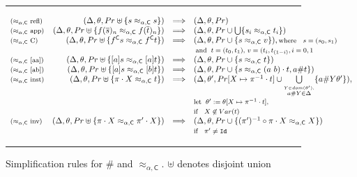 \documentclass[submission,copyright,creativecommons]{eptcs}
\newcommand{\caleq}{\approx_{\alpha,\theory{C}}}
\newcommand{\theory}[1]{\ensuremath{\mathsf{#1}}}
\theoremstyle{plain}
\theoremstyle{definition}
\theoremstyle{remark}
\begin{document}
\begin{figure}[!t]
\rule{15.3cm}{0.01cm}
{\small
    $$    
    \begin{array}{lrll}
        {\text{\footnotesize ($\caleq$ refl)}} & (\Delta, \theta, Pr \uplus \{s \caleq s \}) & \Longrightarrow & (\Delta, \theta, Pr)\\
        {\text{\footnotesize ($\caleq$ app)}} & (\Delta, \theta, Pr \uplus \{f(\overline{s})_n \caleq f(\overline{t})_n \}) & \Longrightarrow & (\Delta, \theta, Pr \cup \bigcup\{ s_i \caleq t_i \} )\\
        {\text{\footnotesize ($\caleq$ C)}} & (\Delta, \theta, Pr \uplus \{f^\theory{C} s \caleq f^\theory{C} t \}) & \Longrightarrow & (\Delta, \theta, Pr \cup \{ s \caleq v \}), {\text{\footnotesize where \; $s=(s_0,s_1)$}}\\
        &&& {\text{\footnotesize\;and\; $t=(t_0,t_1)$, $v=(t_i, t_{(1-i)} , i = 0,1$ }}\\
        {\text{\footnotesize ($\caleq$ [aa])}} & (\Delta, \theta, Pr \uplus \{[a]s \caleq [a]t \}) & \Longrightarrow & (\Delta, \theta, Pr \cup \{ s \caleq t \})\\
        {\text{\footnotesize ($\caleq$ [ab])}} & (\Delta, \theta, Pr \uplus \{[a]s \caleq [b]t \}) & \Longrightarrow & (\Delta, \theta, Pr \cup \{ s \caleq (a\ b)\cdot t, a \# t \})\\
        {\text{\footnotesize ($\caleq$ inst)}} & (\Delta, \theta, Pr \uplus \{ \pi \cdot X \caleq t \}) & \Longrightarrow & (\Delta, \theta', Pr[X\mapsto\pi^{-1}\cdot t] \cup \underset{\overset{Y \in dom(\theta'),}{a \# Y \in \Delta}}{\bigcup} \{a \# Y\theta' \}),\\
        & && {\text{\footnotesize let\; $\theta':= \theta[X \mapsto \pi^{-1} \cdot t]$,}}\\
        & && {\text{\footnotesize if \; $X \not\in Var(t)$} }\\
        {\text{\footnotesize ($\caleq$ inv)}} & (\Delta, \theta, Pr \uplus \{ \pi \cdot X \caleq \pi'\cdot X \}) & \Longrightarrow & (\Delta, \theta, Pr \cup \{ (\pi')^{-1} \circ \pi \cdot X \caleq X \})\;\\
        & & & {\text{\footnotesize if \; $\pi' \neq \texttt{Id}$}}\\
\end{array}
$$    
}
\rule{15.3cm}{0.01cm}
    \caption{Simplification rules for $\#$ and $\caleq$. $\uplus$ denotes disjoint union}
    \label{fig:freshness-and-equal-simp}
\end{figure}
\end{document}
